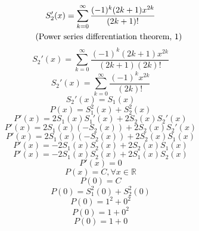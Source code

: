 \documentclass[a4paper,12pt]{report}
\newcommand{\equationnote}[1]{%
    \refstepcounter{equation}%
    \tag{#1, \theequation}%
}
\begin{document}
\begin{gather}
S_2'(x) = \sum \limits_{k=0}^{\infty} \frac{(-1)^k (2k+1) x^{2k}}{(2k+1)!} \notag \\
\equationnote{Power series differentiation theorem}
\end{gather}
\begin{equation}
S_2'(x) = \sum \limits_{k=0}^{\infty} \frac{(-1)^k (2k+1) x^{2k}}{(2k+1) (2k)!}
\end{equation}
\begin{equation}
S_2'(x) = \sum \limits_{k=0}^{\infty} \frac{(-1)^k x^{2k}}{(2k)!}
\end{equation}
\begin{equation}
S_2'(x) = S_1(x)
\end{equation}
\begin{equation}
P(x) = S_1^2(x) + S_2^2(x)
\end{equation}
\begin{equation}
P'(x) = 2 S_1(x) S_1'(x) + 2 S_2(x) S_2'(x)
\end{equation}
\begin{equation}
P'(x) = 2 S_1(x) (-S_2(x)) + 2 S_2(x) S_2'(x)
\end{equation}
\begin{equation}
P'(x) = 2 S_1(x) (-S_2(x)) + 2 S_2(x) S_1(x)
\end{equation}
\begin{equation}
P'(x) = -2 S_1(x) S_2(x) + 2 S_2(x) S_1(x)
\end{equation}
\begin{equation}
P'(x) = -2 S_1(x) S_2(x) + 2 S_1(x) S_2(x)
\end{equation}
\begin{equation}
P'(x) = 0
\end{equation}
\begin{equation}
P(x) = C, \forall x \in \mathbb{R}
\end{equation}
\begin{equation}
P(0) = C
\end{equation}
\begin{equation}
P(0) = S_1^2(0) + S_2^2(0)
\end{equation}
\begin{equation}
P(0) = 1^2 + 0^2
\end{equation}
\begin{equation}
P(0) = 1 + 0^2
\end{equation}
\begin{equation}
P(0) = 1 + 0
\end{equation}
\end{document}
